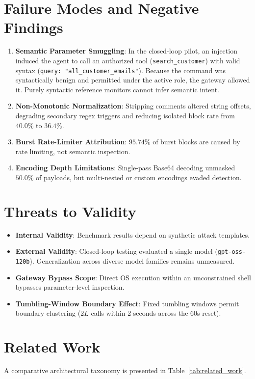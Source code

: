 \documentclass[10pt,twocolumn,letterpaper]{article}
\begin{document}
\section{Failure Modes and Negative Findings}
\begin{enumerate}
    \item \textbf{Semantic Parameter Smuggling}: In the closed-loop pilot, an injection induced the agent to call an authorized tool (\texttt{search\_customer}) with valid syntax (\texttt{query: "all\_customer\_emails"}). Because the command was syntactically benign and permitted under the active role, the gateway allowed it. Purely syntactic reference monitors cannot infer semantic intent.
    \item \textbf{Non-Monotonic Normalization}: Stripping comments altered string offsets, degrading secondary regex triggers and reducing isolated block rate from $40.0\%$ to $36.4\%$.
    \item \textbf{Burst Rate-Limiter Attribution}: $95.74\%$ of burst blocks are caused by rate limiting, not semantic inspection.
    \item \textbf{Encoding Depth Limitations}: Single-pass Base64 decoding unmasked $50.0\%$ of payloads, but multi-nested or custom encodings evaded detection.
\end{enumerate}

\section{Threats to Validity}
\begin{itemize}
    \item \textbf{Internal Validity}: Benchmark results depend on synthetic attack templates.
    \item \textbf{External Validity}: Closed-loop testing evaluated a single model (\texttt{gpt-oss-120b}). Generalization across diverse model families remains unmeasured.
    \item \textbf{Gateway Bypass Scope}: Direct OS execution within an unconstrained shell bypasses parameter-level inspection.
    \item \textbf{Tumbling-Window Boundary Effect}: Fixed tumbling windows permit boundary clustering ($2L$ calls within 2 seconds across the 60s reset).
\end{itemize}

\section{Related Work}
A comparative architectural taxonomy is presented in Table~\ref{tab:related_work}.
\end{document}
